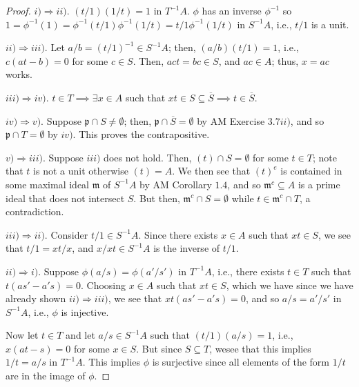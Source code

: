 \documentclass[12pt,letterpaper]{article}
\theoremstyle{definition}
\theoremstyle{remark}
\numberwithin{figure}{problem}
\numberwithin{equation}{section}
\begin{document}
\begin{proof}
  $i) \Rightarrow ii)$. $(t/1)(1/t) = 1$ in $T^{-1}A$. $\phi$ has an inverse $\phi^{-1}$ so $1 = \phi^{-1}(1) = \phi^{-1}(t/1)\phi^{-1}(1/t) = t/1\phi^{-1}(1/t)$ in $S^{-1}A$, i.e., $t/1$ is a unit.
  \par $ii) \Rightarrow iii)$. Let $a/b = (t/1)^{-1} \in S^{-1}A$; then, $(a/b)(t/1) = 1$, i.e., $c(at-b) = 0$ for some $c \in S$. Then, $act = bc \in S$, and $ac \in A$; thus, $x = ac$ works.
  \par $iii) \Rightarrow iv)$. $t \in T \implies \exists x \in A$ such that $xt \in S \subseteq \overline{S} \implies t \in \overline{S}$.
  \par $iv) \Rightarrow v)$. Suppose $\mathfrak{p} \cap S \ne \emptyset$; then, $\mathfrak{p} \cap \overline{S} = \emptyset$ by AM Exercise $3.7ii)$, and so $\mathfrak{p} \cap T = \emptyset$ by $iv)$. This proves the contrapositive.
  \par $v) \Rightarrow iii)$. Suppose $iii)$ does not hold. Then, $(t) \cap S = \emptyset$ for some $t \in T$; note that $t$ is not a unit otherwise $(t) = A$. We then see that $(t)^e$ is contained in some maximal ideal $\mathfrak{m}$ of $S^{-1}A$ by AM Corollary $1.4$, and so $\mathfrak{m}^c \subseteq A$ is a prime ideal that does not intersect $S$. But then, $\mathfrak{m}^c \cap S = \emptyset$ while $t \in \mathfrak{m}^c \cap T$, a contradiction.
  \par $iii) \Rightarrow ii)$. Consider $t/1 \in S^{-1}A$. Since there exists $x \in A$ such that $xt \in S$, we see that $t/1 = xt/x$, and $x/xt \in S^{-1}A$ is the inverse of $t/1$.
  \par $ii) \Rightarrow i)$. Suppose $\phi(a/s) = \phi(a'/s')$ in $T^{-1}A$, i.e., there exists $t \in T$ such that $t(as'-a's) = 0$. Choosing $x \in A$ such that $xt \in S$, which we have since we have already shown $ii) \Rightarrow iii)$, we see that $xt(as'-a's) = 0$, and so $a/s = a'/s'$ in $S^{-1}A$, i.e., $\phi$ is injective.
  \par Now let $t \in T$ and let $a/s \in S^{-1}A$ such that $(t/1)(a/s) = 1$, i.e., $x(at-s) = 0$ for some $x \in S$. But since $S \subseteq T$, wesee that this implies $1/t = a/s$ in $T^{-1}A$. This implies $\phi$ is surjective since all elements of the form $1/t$ are in the image of $\phi$.
\end{proof}
\end{document}
